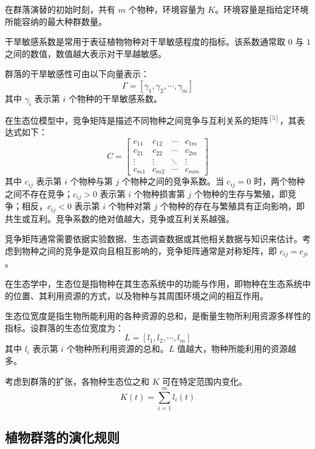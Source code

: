 \documentclass[11pt,a4paper]{ctexart}
\begin{document}
在群落演替的初始时刻，共有 $m$ 个物种，环境容量为 $K$。环境容量是指给定环境所能容纳的最大种群数量。

干旱敏感系数是常用于表征植物物种对干旱敏感程度的指标。该系数通常取 $0$ 与 $1$ 之间的数值，数值越大表示对干旱越敏感。

群落的干旱敏感性可由以下向量表示：
\begin{equation}
\Gamma=[\gamma_1,\gamma_2,\cdots,\gamma_m]
\end{equation}
其中 $\gamma_i$ 表示第 $i$ 个物种的干旱敏感系数。

在生态位模型中，竞争矩阵是描述不同物种之间竞争与互利关系的矩阵$^{[5]}$，其表达式如下：
\begin{equation}
C=\begin{bmatrix}
c_{11} & c_{12} & \cdots & c_{1m}\\
c_{21} & c_{22} & \cdots & c_{2m}\\
\vdots & \vdots & \ddots & \vdots\\
c_{m1} & c_{m2} & \cdots & c_{mm}
\end{bmatrix}
\end{equation}
其中 $c_{ij}$ 表示第 $i$ 个物种与第 $j$ 个物种之间的竞争系数。当 $c_{ij}=0$ 时，两个物种之间不存在竞争；$c_{ij}>0$ 表示第 $i$ 个物种损害第 $j$ 个物种的生存与繁殖，即竞争；相反，$c_{ij}<0$ 表示第 $i$ 个物种对第 $j$ 个物种的存在与繁殖具有正向影响，即共生或互利。竞争系数的绝对值越大，竞争或互利关系越强。

竞争矩阵通常需要依据实验数据、生态调查数据或其他相关数据与知识来估计。考虑到物种之间的竞争是双向且相互影响的，竞争矩阵通常是对称矩阵，即 $c_{ij}=c_{ji}$。

在生态学中，生态位是指物种在其生态系统中的功能与作用，即物种在生态系统中的位置、其利用资源的方式，以及物种与其周围环境之间的相互作用。

生态位宽度是指生物所能利用的各种资源的总和，是衡量生物所利用资源多样性的指标。设群落的生态位宽度为：
\begin{equation}
L=[l_1,l_2,\cdots,l_m]
\end{equation}
其中 $l_i$ 表示第 $i$ 个物种所利用资源的总和。$L$ 值越大，物种所能利用的资源越多。

考虑到群落的扩张，各物种生态位之和 $K$ 可在特定范围内变化。
\begin{equation}
K(t)=\sum_{i=1}^{m}l_i(t)
\end{equation}

\subsection{植物群落的演化规则}
\end{document}
